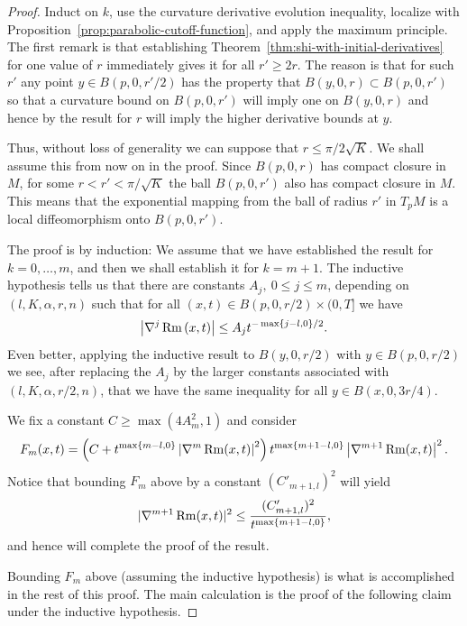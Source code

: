 \begin{proof}
\sketch Induct on $k$, use the curvature derivative evolution inequality,
localize with Proposition~\ref{prop:parabolic-cutoff-function}, and apply
the maximum principle.
The first remark is that establishing Theorem~\ref{thm:shi-with-initial-derivatives} for
one value of $r$ immediately gives it for all $r'\ge 2r$. The reason
is that for such $r'$ any point  $y\in B(p,0,r'/2)$ has the property
that $B(y,0,r)\subset B(p,0,r')$ so that a curvature bound on
$B(p,0,r')$ will imply one on $B(y,0,r)$ and hence by the result for
$r$ will imply the higher derivative bounds at $y$.


 Thus, without loss of
generality we can suppose that $r\le \pi/2\sqrt{K}$. We shall assume this
from now on in the proof. Since
$B(p,0,r)$ has compact closure in $M$, for some $r<r'<\pi/\sqrt{K}$
the ball $B(p,0,r')$ also has compact closure in $M$. This means
that the exponential mapping from the ball of radius $r'$ in $T_pM$
is a local diffeomorphism onto $B(p,0,r')$.

The proof is by induction: We assume that we have established the
result for $k=0,\ldots,m$, and then we shall establish it for
$k=m+1$. The inductive hypothesis tells us that there are constants
$A_j,\ 0\le j\le m$, depending on $(l,K,\alpha,r,n)$ such that for
all $(x,t)\in B(p,0,r/2)\times (0,T]$ we have
\begin{equation}\label{strongineq}
\left\vert \nabla^{j}\operatorname{Rm} \left(  x,t\right)
\right\vert \leq A_{j}t^{-\max\left\{  j-l,0\right\}  /2}.
\end{equation}
 Even better, applying the inductive result to $B(y,0,r/2)$ with
$y\in B(p,0,r/2)$ we see, after replacing the $A_j$ by the
larger constants associated with $(l,K,\alpha,r/2,n)$, that we have
the same inequality for all $y\in B(x,0,3r/4)$.


We fix a constant $C\geq \max(4A^2_m,1)$ and consider
\[
F_{m}(x,t)=\left(  C+t^{\max\left\{ m-l,0\right\} }  \left\vert \nabla
^{m}\operatorname{Rm}(x,t)\right\vert ^{2}\right)  t^{\max\left\{
m+1-l,0\right\}  }\left\vert
\nabla^{m+1}\operatorname{Rm}(x,t)\right\vert ^{2}.
\]
Notice that bounding $F_m$ above by a constant $(C'_{m+1,l})^2$ will
yield
$$|\nabla^{m+1}\operatorname{Rm}(x,t)|^2\le \frac{(C'_{m+1,l})^2}{t^{\max\{m+1-l,0\}}},$$
and hence will complete the proof of the result.

 Bounding $F_m$
above (assuming the inductive hypothesis) is what is accomplished in
the rest of this proof. The main calculation is the proof of the
following claim under the inductive hypothesis.
\end{proof}

